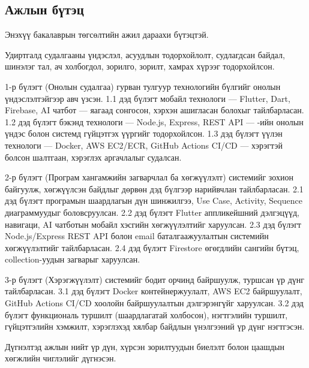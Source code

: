 \subsection*{Ажлын бүтэц}

Энэхүү бакалаврын төгсөлтийн ажил дараахи бүтэцтэй.

Удиртгалд судалгааны үндэслэл, асуудлын тодорхойлолт, судлагдсан байдал, шинэлэг тал, ач холбогдол, зорилго, зорилт, хамрах хүрээг тодорхойлсон.

1-р бүлэгт (Онолын судалгаа) гурван тулгуур технологийн бүлгийг онолын үндэслэлтэйгээр авч үзсэн. 1.1 дэд бүлэгт мобайл технологи --- Flutter, Dart, Firebase, AI чатбот --- яагаад сонгосон, хэрхэн ашигласан болохыг тайлбарласан. 1.2 дэд бүлэгт бэкэнд технологи --- Node.js, Express, REST API --- -ийн онолын үндэс болон системд гүйцэтгэх үүргийг тодорхойлсон. 1.3 дэд бүлэгт үүлэн технологи --- Docker, AWS EC2/ECR, GitHub Actions CI/CD --- хэрэгтэй болсон шалтгаан, хэрэглэх аргачлалыг судалсан.

2-р бүлэгт (Програм хангамжийн загварчлал ба хөгжүүлэлт) системийг зохион байгуулж, хөгжүүлсэн байдлыг дөрвөн дэд бүлгээр нарийвчлан тайлбарласан. 2.1 дэд бүлэгт програмын шаардлагын дүн шинжилгээ, Use Case, Activity, Sequence диаграммуудыг боловсруулсан. 2.2 дэд бүлэгт Flutter аппликейшний дэлгэцүүд, навигаци, AI чатботын мобайл хэсгийн хөгжүүлэлтийг харуулсан. 2.3 дэд бүлэгт Node.js/Express REST API болон email баталгаажуулалтын системийн хөгжүүлэлтийг тайлбарласан. 2.4 дэд бүлэгт Firestore өгөгдлийн сангийн бүтэц, collection-уудын загварыг харуулсан.

3-р бүлэгт (Хэрэгжүүлэлт) системийг бодит орчинд байршуулж, туршсан үр дүнг тайлбарласан. 3.1 дэд бүлэгт Docker контейнержуулалт, AWS EC2 байршуулалт, GitHub Actions CI/CD хоолойн байршуулалтын дэлгэрэнгүйг харуулсан. 3.2 дэд бүлэгт функциональ туршилт (шаардлагатай холбосон), нэгтгэлийн туршилт, гүйцэтгэлийн хэмжилт, хэрэглэхэд хялбар байдлын үнэлгээний үр дүнг нэгтгэсэн.

Дүгнэлтэд ажлын нийт үр дүн, хүрсэн зорилтуудын биелэлт болон цаашдын хөгжлийн чиглэлийг дүгнэсэн.
